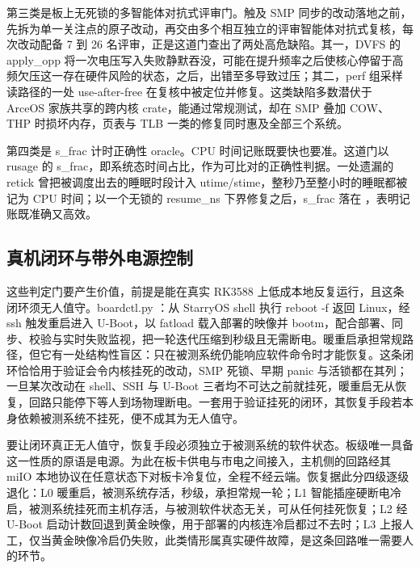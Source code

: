 第三类是板上无死锁的多智能体对抗式评审门。触及 SMP 同步的改动落地之前，先拆为单一关注点的原子改动，再交由多个相互独立的评审智能体对抗式复核，每次改动配备 7 到 26 名评审，正是这道门查出了两处高危缺陷。其一，DVFS 的 apply\_opp 将一次电压写入失败静默吞没，可能在提升频率之后使核心停留于高频欠压这一存在硬件风险的状态，之后，出错至多导致过压；其二，perf 组采样读路径的一处 use-after-free 在复核中被定位并修复。这类缺陷多数潜伏于 ArceOS 家族共享的跨内核 crate，能通过常规测试，却在 SMP 叠加 COW、THP 时损坏内存，页表与 TLB 一类的修复同时惠及全部三个系统。

第四类是 s\_frac 计时正确性 oracle。CPU 时间记账既要快也要准。这道门以 rusage 的 s\_frac，即系统态时间占比，作为可比对的正确性判据。一处遗漏的 retick 曾把被调度出去的睡眠时段计入 utime/stime，整秒乃至整小时的睡眠都被记为 CPU 时间；以一个无锁的 resume\_ns 下界修复之后，s\_frac 落在 ，表明记账既准确又高效。

\subsection{真机闭环与带外电源控制}

这些判定门要产生价值，前提是能在真实 RK3588 上低成本地反复运行，且这条闭环须无人值守。boardctl.py ：从 StarryOS shell 执行 reboot -f 返回 Linux，经 ssh 触发重启进入 U-Boot，以 fatload 载入部署的映像并 bootm，配合部署、同步、校验与实时失败监视，把一轮迭代压缩到秒级且无需断电。暖重启承担常规路径，但它有一处结构性盲区：只在被测系统仍能响应软件命令时才能恢复。这条闭环恰恰用于验证会令内核挂死的改动，SMP 死锁、早期 panic 与活锁都在其列；一旦某次改动在 shell、SSH 与 U-Boot 三者均不可达之前就挂死，暖重启无从恢复，回路只能停下等人到场物理断电。一套用于验证挂死的闭环，其恢复手段若本身依赖被测系统不挂死，便不成其为无人值守。


要让闭环真正无人值守，恢复手段必须独立于被测系统的软件状态。板级唯一具备这一性质的原语是电源。为此在板卡供电与市电之间接入，主机侧的回路经其 miIO 本地协议在任意状态下对板卡冷复位，全程不经云端。恢复据此分四级逐级退化：L0 暖重启，被测系统存活，秒级，承担常规一轮；L1 智能插座硬断电冷启，被测系统挂死而主机存活，与被测软件状态无关，可从任何挂死恢复；L2 经 U-Boot 启动计数回退到黄金映像，用于部署的内核连冷启都过不去时；L3 上报人工，仅当黄金映像冷启仍失败，此类情形属真实硬件故障，是这条回路唯一需要人的环节。

